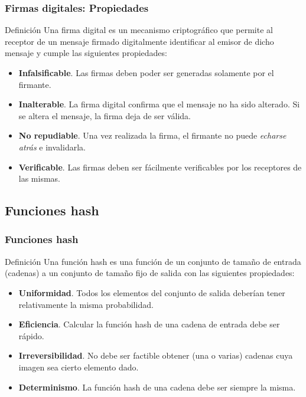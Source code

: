 \documentclass{beamer}
\begin{document}
\begin{frame}
    \frametitle{Firmas digitales: Propiedades}

    \begin{block}{Definición}
        Una \alert{firma digital} es un mecanismo criptográfico que permite al receptor de un mensaje firmado digitalmente identificar al emisor de dicho mensaje y cumple las siguientes propiedades:
    \end{block}

    \begin{itemize}
        \item \textbf{Infalsificable}. Las firmas deben poder ser generadas solamente por el firmante.
        \item \textbf{Inalterable}. La firma digital confirma que el mensaje no ha sido alterado. Si se altera el mensaje, la firma deja de ser válida.
        \item \textbf{No repudiable}. Una vez realizada la firma, el firmante no puede \textit{echarse atrás} e invalidarla.
        \item \textbf{Verificable}. Las firmas deben ser fácilmente verificables por los receptores de las mismas.
    \end{itemize}
    
\end{frame}

\subsection{Funciones hash}

\begin{frame}
    \frametitle{Funciones hash}

    \begin{block}{Definición}
        Una \alert{función hash} es una función de un conjunto de tamaño de entrada (cadenas) a un conjunto de tamaño fijo de salida con las siguientes propiedades:
    \end{block}

    \begin{itemize}
        \item \textbf{Uniformidad}. Todos los elementos del conjunto de salida deberían tener relativamente la misma probabilidad.
        \item \textbf{Eficiencia}. Calcular la función hash de una cadena de entrada debe ser rápido.
        \item \textbf{Irreversibilidad}. No debe ser factible obtener (una o varias) cadenas cuya imagen sea cierto elemento dado.
        \item \textbf{Determinismo}. La función hash de una cadena debe ser siempre la misma.
    \end{itemize}
    
\end{frame}
\end{document}
